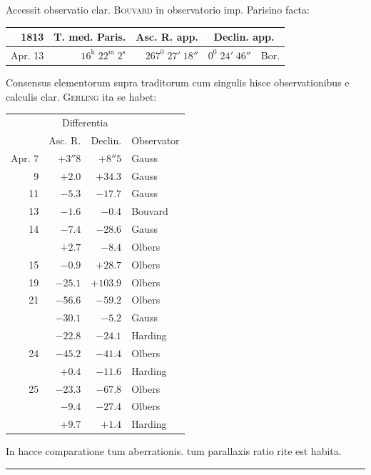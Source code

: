 Accessit observatio clar. \textsc{Bouvard} in observatorio imp. Parisino facta:
\begin{center}\small\setlength{\tabcolsep}{4pt}
\begin{tabular}{r|r|r|r l}
1813&T. med. Paris.&Asc. R. app.&\multicolumn{2}{c}{Declin. app.}\\\hline
Apr. 13&$16^{\mathrm h}\;22^{\mathrm m}\;2^{\mathrm s}$&$267^0\;27'\;18''$&$0^0\;24'\;46''$&Bor.
\end{tabular}\end{center}

Consensus elementorum supra traditorum cum singulis hisce observationibus e calculis clar. \textsc{Gerling} ita se habet:
\begin{center}\small\setlength{\tabcolsep}{6pt}
\begin{tabular}{r|r|r|l}
&\multicolumn{2}{c|}{Differentia}&\\
&Asc. R.&Declin.&Observator\\\hline
Apr. 7&$+3''8$&$+8''5$&Gauss\\
9&$+2.0$&$+34.3$&Gauss\\
11&$-5.3$&$-17.7$&Gauss\\
13&$-1.6$&$-0.4$&Bouvard\\
14&$-7.4$&$-28.6$&Gauss\\
&$+2.7$&$-8.4$&Olbers\\
15&$-0.9$&$+28.7$&Olbers\\
19&$-25.1$&$+103.9$&Olbers\\
21&$-56.6$&$-59.2$&Olbers\\
&$-30.1$&$-5.2$&Gauss\\
&$-22.8$&$-24.1$&Harding\\
24&$-45.2$&$-41.4$&Olbers\\
&$+0.4$&$-11.6$&Harding\\
25&$-23.3$&$-67.8$&Olbers\\
&$-9.4$&$-27.4$&Olbers\\
&$+9.7$&$+1.4$&Harding
\end{tabular}\end{center}

In hacce comparatione tum aberrationis. tum parallaxis ratio rite est habita.
\begin{center}\rule{.25\linewidth}{.3pt}\end{center}

